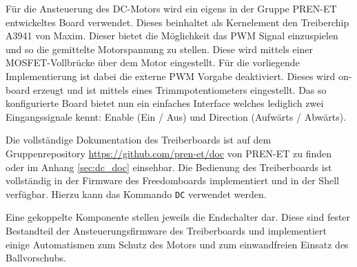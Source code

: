 Für die Ansteuerung des DC-Motors wird ein eigens in der Gruppe
PREN-ET entwickeltes Board verwendet. Dieses beinhaltet als
Kernelement den Treiberchip A3941 von Maxim. Dieser bietet die
Möglichkeit das PWM Signal einzuspielen und so die gemittelte
Motorspannung zu stellen. Diese wird mittels einer
MOSFET-Vollbrücke über dem Motor eingestellt. Für die vorliegende
Implementierung ist dabei die externe PWM Vorgabe deaktiviert.
Dieses wird on-board erzeugt und ist mittels eines
Trimmpotentiometers eingestellt. Das so konfigurierte Board
bietet nun ein einfaches Interface welches lediglich zwei
Eingangssignale kennt: Enable (Ein / Aus) und Direction (Aufwärts
/ Abwärts).

Die vollständige Dokumentation des Treiberboards ist auf dem
Gruppenrepository \url{https://github.com/pren-et/doc}
von PREN-ET zu finden oder im Anhang \ref{sec:dc_doc} einsehbar.
Die Bedienung des Treiberboards ist vollständig in der Firmware des
Freedomboards implementiert und in der Shell verfügbar. Hierzu kann
das Kommando \verb!DC! verwendet werden.

Eine gekoppelte Komponente stellen jeweils die Endschalter dar.
Diese sind fester Bestandteil der Ansteuerungsfirmware des
Treiberboards und implementiert einige Automatismen zum Schutz
des Motors und zum einwandfreien Einsatz des Ballvorschubs.
